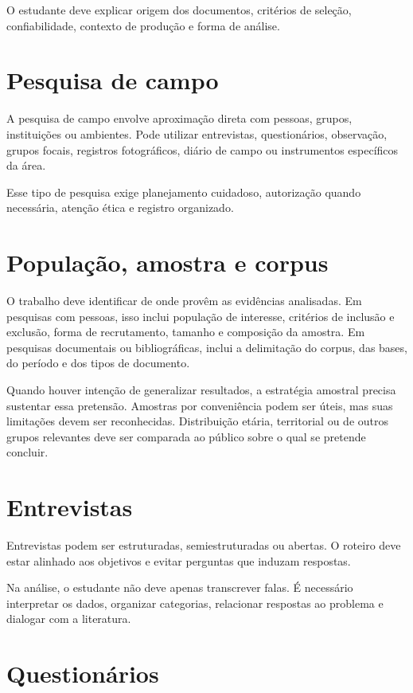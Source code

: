 O estudante deve explicar origem dos documentos, critérios de seleção, confiabilidade, contexto de produção e forma de análise.

\section{Pesquisa de campo}

A pesquisa de campo envolve aproximação direta com pessoas, grupos, instituições ou ambientes. Pode utilizar entrevistas, questionários, observação, grupos focais, registros fotográficos, diário de campo ou instrumentos específicos da área.

Esse tipo de pesquisa exige planejamento cuidadoso, autorização quando necessária, atenção ética e registro organizado.

\section{População, amostra e corpus}

O trabalho deve identificar de onde provêm as evidências analisadas. Em pesquisas com pessoas, isso inclui população de interesse, critérios de inclusão e exclusão, forma de recrutamento, tamanho e composição da amostra. Em pesquisas documentais ou bibliográficas, inclui a delimitação do corpus, das bases, do período e dos tipos de documento.

Quando houver intenção de generalizar resultados, a estratégia amostral precisa sustentar essa pretensão. Amostras por conveniência podem ser úteis, mas suas limitações devem ser reconhecidas. Distribuição etária, territorial ou de outros grupos relevantes deve ser comparada ao público sobre o qual se pretende concluir.

\section{Entrevistas}

Entrevistas podem ser estruturadas, semiestruturadas ou abertas. O roteiro deve estar alinhado aos objetivos e evitar perguntas que induzam respostas.

Na análise, o estudante não deve apenas transcrever falas. É necessário interpretar os dados, organizar categorias, relacionar respostas ao problema e dialogar com a literatura.

\section{Questionários}

